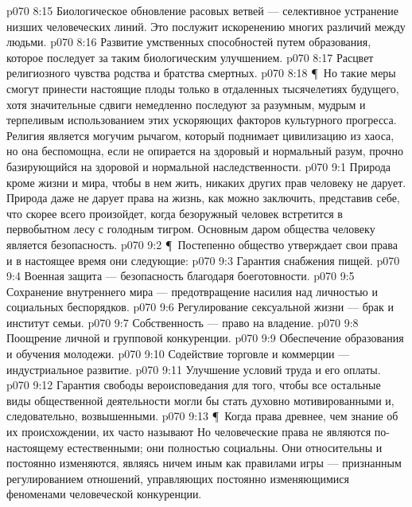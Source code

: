 \vs p070 8:15 \bibnobreakspace Биологическое обновление расовых ветвей --- селективное устранение низших человеческих линий. Это послужит искоренению многих различий между людьми.
\vs p070 8:16 \bibnobreakspace Развитие умственных способностей путем образования, которое последует за таким биологическим улучшением.
\vs p070 8:17 \bibnobreakspace Расцвет религиозного чувства родства и братства смертных.
\vs p070 8:18 \P\ Но такие меры смогут принести настоящие плоды только в отдаленных тысячелетиях будущего, хотя значительные сдвиги немедленно последуют за разумным, мудрым и терпеливым использованием этих ускоряющих факторов культурного прогресса. Религия является могучим рычагом, который поднимает цивилизацию из хаоса, но она беспомощна, если не опирается на здоровый и нормальный разум, прочно базирующийся на здоровой и нормальной наследственности.
\vs p070 9:1 Природа кроме жизни и мира, чтобы в нем жить, никаких других прав человеку не дарует. Природа даже не дарует права на жизнь, как можно заключить, представив себе, что скорее всего произойдет, когда безоружный человек встретится в первобытном лесу с голодным тигром. Основным даром общества человеку является безопасность.
\vs p070 9:2 \P\ Постепенно общество утверждает свои права и в настоящее время они следующие:
\vs p070 9:3 \bibnobreakspace Гарантия снабжения пищей.
\vs p070 9:4 \bibnobreakspace Военная защита --- безопасность благодаря боеготовности.
\vs p070 9:5 \bibnobreakspace Сохранение внутреннего мира --- предотвращение насилия над личностью и социальных беспорядков.
\vs p070 9:6 \bibnobreakspace Регулирование сексуальной жизни --- брак и институт семьи.
\vs p070 9:7 \bibnobreakspace Собственность --- право на владение.
\vs p070 9:8 \bibnobreakspace Поощрение личной и групповой конкуренции.
\vs p070 9:9 \bibnobreakspace Обеспечение образования и обучения молодежи.
\vs p070 9:10 \bibnobreakspace Содействие торговле и коммерции --- индустриальное развитие.
\vs p070 9:11 \bibnobreakspace Улучшение условий труда и его оплаты.
\vs p070 9:12 \bibnobreakspace Гарантия свободы вероисповедания для того, чтобы все остальные виды общественной деятельности могли бы стать духовно мотивированными и, следовательно, возвышенными.
\vs p070 9:13 \P\ Когда права древнее, чем знание об их происхождении, их часто называют  Но человеческие права не являются по\hyp{}настоящему естественными; они полностью социальны. Они относительны и постоянно изменяются, являясь ничем иным как правилами игры --- признанным регулированием отношений, управляющих постоянно изменяющимися феноменами человеческой конкуренции.
